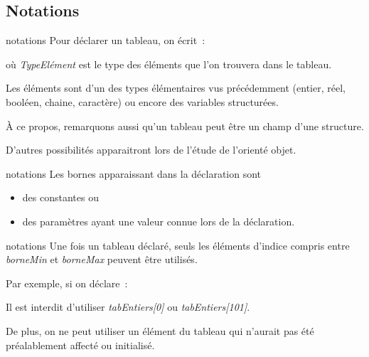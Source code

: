 \subsection{Notations}

\begin{frame}{notations}
	Pour déclarer un tableau, on écrit~:

	
	où \textit{TypeElément} est le type des éléments que l’on
	trouvera dans le tableau. 
	
	\bigskip
	
	Les éléments sont d’un des types élémentaires
	vus précédemment (entier, réel, booléen, chaine, caractère) ou encore
	des variables structurées. 
	
	\bigskip
	
	À ce propos, remarquons aussi
	qu'un tableau peut être un champ d'une structure. 
	
	D'autres possibilités apparaitront lors de l'étude de
	l'orienté objet.

\end{frame}

\begin{frame}{notations}
	Les bornes apparaissant dans la déclaration sont 
	\begin{itemize}
	\item
	des constantes ou 
	\item
	des paramètres ayant une valeur connue lors de la déclaration. 
	\end{itemize}
\end{frame}

\begin{frame}{notations}
	Une fois un	tableau déclaré, seuls les éléments d’indice compris entre
	\textit{borneMin} et \textit{borneMax} peuvent
	être utilisés. 
	
	\bigskip
	
	Par exemple, si on déclare~:

	
	\bigskip
	
	Il est interdit d’utiliser \textit{tabEntiers[0]} ou
	\textit{tabEntiers[101]}. 
	
	De plus, on ne peut utiliser un élément du tableau qui n’aurait pas été
	préalablement affecté ou initialisé.
\end{frame}

